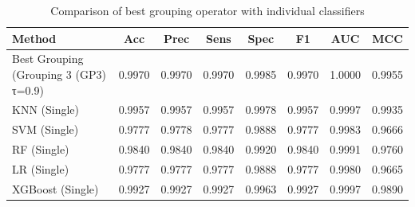 \begin{table}[htbp]
\centering
\caption{Comparison of best grouping operator with individual classifiers}
\label{tab:t2_best_vs_clf}
\begin{tabular}{lccccccc}
\toprule
Method & Acc & Prec & Sens & Spec & F1 & AUC & MCC \\
\midrule
Best Grouping (Grouping 3 (GP3) τ=0.9) & 0.9970 & 0.9970 & 0.9970 & 0.9985 & 0.9970 & 1.0000 & 0.9955 \\
KNN (Single) & 0.9957 & 0.9957 & 0.9957 & 0.9978 & 0.9957 & 0.9997 & 0.9935 \\
SVM (Single) & 0.9777 & 0.9778 & 0.9777 & 0.9888 & 0.9777 & 0.9983 & 0.9666 \\
RF (Single) & 0.9840 & 0.9840 & 0.9840 & 0.9920 & 0.9840 & 0.9991 & 0.9760 \\
LR (Single) & 0.9777 & 0.9777 & 0.9777 & 0.9888 & 0.9777 & 0.9980 & 0.9665 \\
XGBoost (Single) & 0.9927 & 0.9927 & 0.9927 & 0.9963 & 0.9927 & 0.9997 & 0.9890 \\
\bottomrule
\end{tabular}
\end{table}
